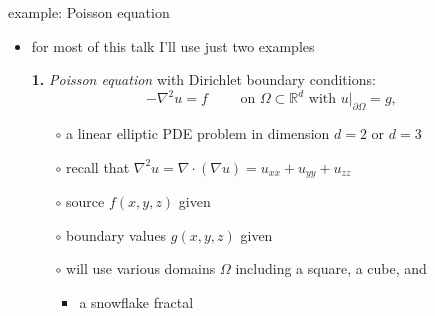 \documentclass[hide notes,intlimits,usenames,dvipsnames]{beamer}
\newcommand{\RR}{\mathbb{R}}
\newcommand{\Div}{\nabla\cdot}
\newcommand{\grad}{\nabla}
\begin{document}
\begin{frame}{example: Poisson equation}

\begin{itemize}
\item for most of this talk I'll use just two examples

\bigskip
\item[\textbf{1.}] \emph{Poisson equation} with Dirichlet boundary conditions:
	    $$- \grad^2 u = f \qquad \text{ on } \Omega \subset \RR^d \text{ with } u\big|_{\partial \Omega} = g,$$
    \vspace{-5mm}
	\begin{itemize}
	\item[$\circ$] a linear elliptic PDE problem in dimension $d=2$ or $d=3$
	\item[$\circ$] recall that $\grad^2 u = \Div \left(\grad u\right) = u_{xx}+u_{yy}+u_{zz}$
	\item[$\circ$] source $f(x,y,z)$ given
	\item[$\circ$] boundary values $g(x,y,z)$ given
	\item[$\circ$] will use various domains $\Omega$ including a square, a cube, and
		\begin{itemize}
        \item a snowflake fractal \hspace{0.3in} \begin{tikzpicture}[scale=1.2,baseline]  \end{tikzpicture}
        \end{itemize}
	\end{itemize}
\end{itemize}
\end{frame}
\end{document}
